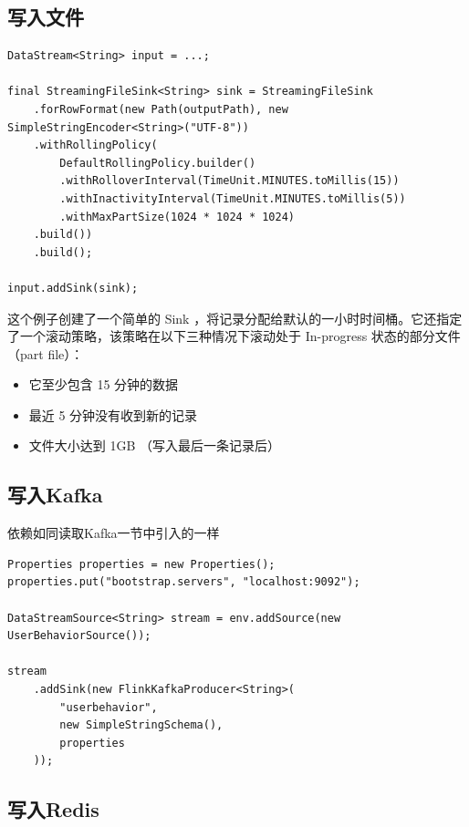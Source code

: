 \documentclass[cn,11pt,chinese]{elegantbook}
\begin{document}
\subsection{写入文件}

\begin{verbatim}
DataStream<String> input = ...;

final StreamingFileSink<String> sink = StreamingFileSink
    .forRowFormat(new Path(outputPath), new SimpleStringEncoder<String>("UTF-8"))
    .withRollingPolicy(
        DefaultRollingPolicy.builder()
        .withRolloverInterval(TimeUnit.MINUTES.toMillis(15))
        .withInactivityInterval(TimeUnit.MINUTES.toMillis(5))
        .withMaxPartSize(1024 * 1024 * 1024)
    .build())
    .build();

input.addSink(sink);
\end{verbatim}

这个例子创建了一个简单的 Sink ，将记录分配给默认的一小时时间桶。它还指定了一个滚动策略，该策略在以下三种情况下滚动处于 In-progress 状态的部分文件（part file）：

\begin{itemize}
    \item 它至少包含 15 分钟的数据
    \item 最近 5 分钟没有收到新的记录
    \item 文件大小达到 1GB （写入最后一条记录后）
\end{itemize}

\subsection{写入Kafka}

依赖如同读取Kafka一节中引入的一样

\begin{verbatim}
Properties properties = new Properties();
properties.put("bootstrap.servers", "localhost:9092");

DataStreamSource<String> stream = env.addSource(new UserBehaviorSource());

stream
    .addSink(new FlinkKafkaProducer<String>(
        "userbehavior",
        new SimpleStringSchema(),
        properties
    ));
\end{verbatim}

\subsection{写入Redis}
\end{document}
